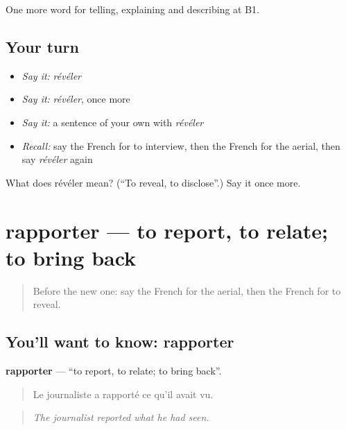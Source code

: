 \begin{grammarlens}[title={What you've built}]
One more word for telling, explaining and describing at B1.
\end{grammarlens}

\subsection*{Your turn}
\begin{itemize}
\raggedright
  \item \emph{Say it:} \emph{révéler}
  \item \emph{Say it:} \emph{révéler}, once more
  \item \emph{Say it:} a sentence of your own with \emph{révéler}
  \item \emph{Recall:} say the French for to interview, then the French for the aerial, then say \emph{révéler} again
\end{itemize}

\begin{tcolorbox}[breakable,colback=teal!4,colframe=teal!35!black,title={Before you move on}]
What does révéler mean? (\textquotedblleft{}To reveal, to disclose\textquotedblright{}.) Say it once more.
\end{tcolorbox}
\section[rapporter]{rapporter — to report, to relate; to bring back}

\label{lesson:FR-C284-rapporter}



\begin{quote}
Before the new one: say the French for the aerial, then the French for to reveal.
\end{quote}

\subsection*{You'll want to know: rapporter}
\textbf{rapporter} — \textquotedblleft{}to report, to relate; to bring back\textquotedblright{}.

\begin{quote}
Le journaliste a rapporté ce qu'il avait vu.
\end{quote}

\begin{quote}
\emph{The journalist reported what he had seen.}
\end{quote}

